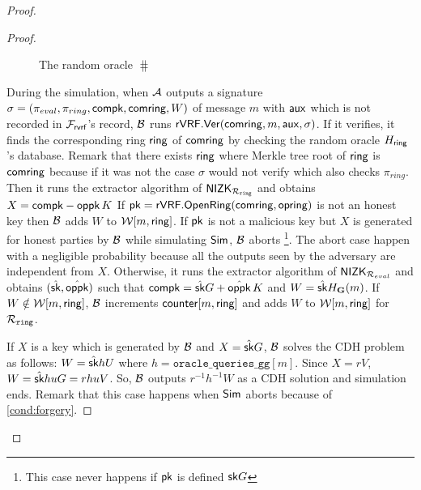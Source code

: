 \begin{proof}
\begin{proof}
\begin{figure}
{{				}}	
				\caption{The random oracle $ \hash $}
				\label{oracle:HbyB}
			\end{figure}
			
%				
%						
%						
%						
%						
%						
%						
%						
%						
%						

			
			During the simulation, when $ \mathcal{A} $ outputs a signature $ \sigma = (\pi_{eval},\pi_{ring},\mathsf{compk},\mathsf{comring},W) $ of message $ m $ with $ \mathsf{aux} $ which is not recorded in $ \mathcal{F}_{\textsf{rvrf}} $'s record, $ \mathcal{B} $ runs $ {\mathsf{rVRF}}.{\mathsf{Ver}}(\mathsf{comring},m, \mathsf{aux}, \sigma) $. If it verifies, it finds the corresponding ring $ \mathsf{ring} $ of $ \mathsf{comring} $ by checking the random oracle $ H_\mathsf{ring} $'s database. Remark that there exists $ \mathsf{ring} $ where Merkle tree root of $ \mathsf{ring} $ is $ \mathsf{comring} $ because if it was not the case $ \sigma $ would not verify which also checks  $ \pi_{ring} $. 
			Then it runs the extractor algorithm of $ {\mathsf{NIZK}}_{\mathcal{R}_{\mathtt{ring}}} $ and obtains $ X = \mathsf{compk} - \mathsf{oppk} \, K $
			If $ \mathsf{pk} = {\mathsf{rVRF}}.{\mathsf{OpenRing}}(\mathsf{comring},\mathsf{opring}) $ is not an honest key then $\mathcal{B} $ adds $ W $  to $ \mathcal{W}[m, \mathsf{ring}] $.  If $ \mathsf{pk} $ is not a malicious key but $ X $ is  generated for honest parties by $ \mathcal{B} $ while simulating $ \mathsf{Sim} $, $ \mathcal{B} $ aborts \footnote{This case never happens if $ \mathsf{pk}  $ is defined $ \mathsf{sk}G $}. The abort case happen with a negligible probability because all the outputs seen by the adversary are independent from $ X $.
			Otherwise, it  runs the extractor algorithm of $ {\mathsf{NIZK}}_{\mathcal{R}_{eval}} $ and obtains $(\hat{\mathsf{sk}},\hat{\mathsf{oppk}} )$ such that $ \mathsf{compk} = \hat{\mathsf{sk}}G + \hat{\mathsf{oppk}} \, K $ and $ W = \hat{\mathsf{sk}} H_{\mathbf{G}}(m) $. If  $ W \notin \mathcal{W}[m, \mathsf{ring}] $, $ \mathcal{B} $ increments  $ \mathsf{counter}[m,\mathsf{ring}] $ and adds $ W $ to $ \mathcal{W}[m,\mathsf{ring}] $ for $ \mathcal{R}_{\mathtt{ring}} $.
			
			If $ X  $ is a key which is generated by $ \mathcal{B} $ and $ X = \hat{\mathsf{sk}}G $, $ \mathcal{B} $ solves the CDH problem as follows: $ W = \hat{\mathsf{sk}} h U $ where $ h = \mathtt{oracle\_queries\_gg}[m] $. Since $ X = r V $, $ W = \hat{\mathsf{sk}}huG =rhuV $. So, $ \mathcal{B} $ outputs $ r^{-1}h^{-1}W $ as a CDH solution and simulation ends. Remark that this case happens when $ \mathsf{Sim} $ aborts because of \ref{cond:forgery}.
			

\end{proof}
\end{proof}
